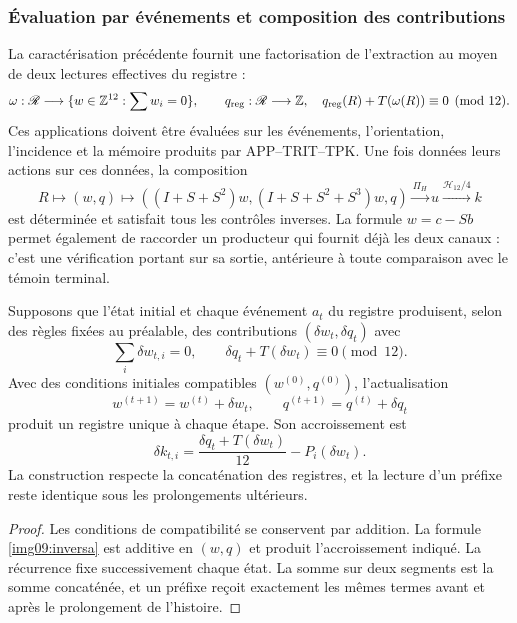 \subsubsection{Évaluation par événements et composition des contributions}

La caractérisation précédente fournit une factorisation de l'extraction au moyen de deux
lectures effectives du registre :
\begin{equation}
 \omega:\mathscr R\longrightarrow
 \{w\in\mathbb Z^{12}:\sum w_i=0\},\qquad
 q_{\rm reg}:\mathscr R\longrightarrow\mathbb Z,
 \quad q_{\rm reg}(R)+T(\omega(R))\equiv0\pmod {12}.
 \label{img09:contrato-productor}
\end{equation}
Ces applications doivent être évaluées sur les événements, l'orientation,
l'incidence et la mémoire produits par APP--TRIT--TPK. Une fois données leurs
actions sur ces données, la composition
\[
 R\longmapsto(w,q)\longmapsto
 ((I+S+S^2)w,(I+S+S^2+S^3)w,q)
 \xrightarrow{\Pi_H}u\xrightarrow{\mathcal H_{12}/4}k
\]
est déterminée et satisfait tous les contrôles inverses. La formule
$w=c-Sb$ permet également de raccorder un producteur qui fournit déjà les deux
canaux : c'est une vérification portant sur sa sortie, antérieure à toute comparaison
avec le témoin terminal.

\begin{proposition}
\label{img09:acumulacion}
Supposons que l'état initial et chaque événement $a_t$ du registre
produisent, selon des règles fixées au préalable, des contributions
$(\delta w_t,\delta q_t)$ avec
\[
 \sum_i\delta w_{t,i}=0,\qquad
 \delta q_t+T(\delta w_t)\equiv0\pmod {12}.
\]
Avec des conditions initiales compatibles $(w^{(0)},q^{(0)})$,
l'actualisation
\[
 w^{(t+1)}=w^{(t)}+\delta w_t,\qquad
 q^{(t+1)}=q^{(t)}+\delta q_t
\]
produit un registre unique à chaque étape. Son accroissement est
\[
 \delta k_{t,i}=
 \frac{\delta q_t+T(\delta w_t)}{12}-P_i(\delta w_t).
\]
La construction respecte la concaténation des registres, et la lecture
d'un préfixe reste identique sous les prolongements ultérieurs.
\end{proposition}
\begin{proof}
Les conditions de compatibilité se conservent par addition. La formule
\eqref{img09:inversa} est additive en $(w,q)$ et produit
l'accroissement indiqué. La récurrence fixe successivement chaque état.
La somme sur deux segments est la somme concaténée, et un préfixe reçoit
exactement les mêmes termes avant et après le prolongement de l'histoire.
\end{proof}

